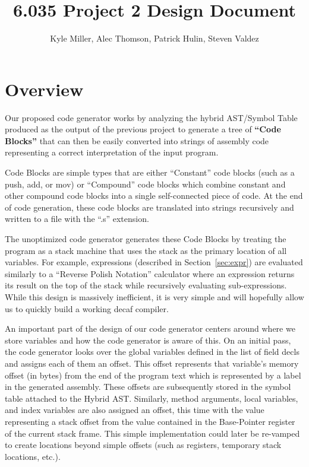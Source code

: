 \documentclass[11pt]{article}
\title{6.035 Project 2 Design Document}
\author{Kyle Miller, Alec Thomson, Patrick Hulin, Steven Valdez}
\begin{document}
\maketitle

\section{Overview}

Our proposed code generator works by analyzing the hybrid AST/Symbol Table produced as the output of the previous project to generate a tree of \textbf{``Code Blocks''} that can then be easily converted into strings of assembly code representing a correct interpretation of the input program. 

Code Blocks are simple types that are either ``Constant'' code blocks (such as a push, add, or mov) or ``Compound'' code blocks which combine constant and other compound code blocks into a single self-connected piece of code. At the end of code generation, these code blocks are translated into strings recursively and written to a file with the ``.s'' extension. 

The unoptimized code generator generates these Code Blocks by treating the program as a stack machine that uses the stack as the primary location of all variables. For example, expressions (described in Section~\ref{sec:expr}) are evaluated similarly to a ``Reverse Polish Notation'' calculator where an expression returns its result on the top of the stack while recursively  evaluating sub-expressions. While this design is massively inefficient, it is very simple and will hopefully allow us to quickly build a working decaf compiler. 

An important part of the design of our code generator centers around where we store variables and how the code generator is aware of this. On an initial pass, the code generator looks over the global variables defined in the list of field decls and assigns each of them an offset. This offset represents that variable's memory offset (in bytes) from the end of the program text which is represented by a label in the generated assembly. These offsets are subsequently stored in the symbol table attached to the Hybrid AST. Similarly, method arguments, local variables, and index variables are also assigned an offset, this time with the value representing a stack offset from the value contained in the Base-Pointer register of the current stack frame. This simple implementation could later be re-vamped to create locations beyond simple offsets (such as registers, temporary stack locations, etc.). 
\end{document}
